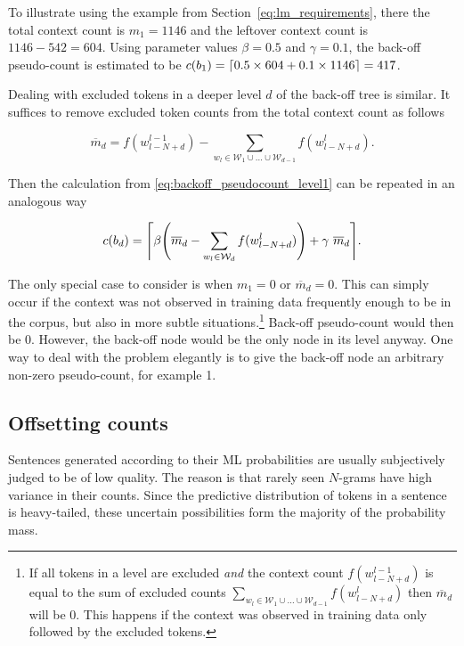 \documentclass[draft]{IIBproject}
\DeclarePairedDelimiter{\ceil}{\lceil}{\rceil}
\DeclarePairedDelimiter{\bracket}{(}{)}
\begin{document}
To illustrate using the example from Section~\ref{eq:lm_requirements}, there the total context count is $m_1 = 1146$ and the leftover context count is $1146-542=604$. Using parameter values $\beta = 0.5$ and $\gamma = 0.1$, the back-off pseudo-count is estimated to be $c(b_1) = \ceil*{ 0.5 \times 604 + 0.1 \times 1146 } = 417$.

Dealing with excluded tokens in a deeper level $d$ of the back-off tree is similar. It suffices to remove excluded token counts from the total context count as follows

\begin{equation}
\label{eq:adjusted_context_count}
\overline m_d = f(w_{l-N+d}^{l-1}) - \sum_{w_l \in \mathcal W_1 \cup \dots \cup \mathcal W_{d-1}} f(w_{l-N+d}^l).
\end{equation}

Then the calculation from \cref{eq:backoff_pseudocount_level1} can be repeated in an analogous way

\begin{equation}
\label{eq:backoff_pseudocount_deep_levels}
c(b_d) = \ceil*{ \beta \bracket*{ \overline m_d - \sum_{w_l \in \mathcal W_d} f(w_{l-N+d}^l) } + \gamma ~ \overline m_d }.
\end{equation}

The only special case to consider is when $m_1 = 0$ or $\overline m_d = 0$. This can simply occur if the context was not observed in training data frequently enough to be in the corpus, but also in more subtle situations.\footnote{If all tokens in a level are excluded \emph{and} the context count $f(w_{l-N+d}^{l-1})$ is equal to the sum of excluded counts $\sum_{w_l \in \mathcal W_1 \cup \dots \cup \mathcal W_{d-1}} f(w_{l-N+d}^l)$ then $\overline m_d$ will be 0. This happens if the context was observed in training data only followed by the excluded tokens.} Back-off pseudo-count would then be 0. However, the back-off node would be the only node in its level anyway. One way to deal with the problem elegantly is to give the back-off node an arbitrary non-zero pseudo-count, for example 1.

\FloatBarrier
\subsection{Offsetting counts}
\label{sec:offsetting_counts}

Sentences generated according to their ML probabilities are usually subjectively judged to be of low quality. The reason is that rarely seen $N$-grams have high variance in their counts. Since the predictive distribution of tokens in a sentence is heavy-tailed, these uncertain possibilities form the majority of the probability mass.
\end{document}
